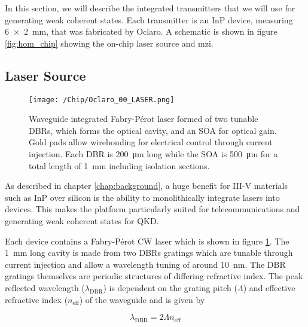 In this section, we will describe the integrated transmitters that we will use for generating weak coherent states. Each transmitter is an \ac{InP} device, measuring \SI{6x2}{mm}, that was fabricated by Oclaro. A schematic is shown in figure \ref{fig:hom_chip} showing the on-chip laser source and \ac{mzi}.

\subsection{Laser Source}

\begin{figure}[t]
	\centering
	\texttt{[image: /Chip/Oclaro\_00\_LASER.png]}
	\caption[Microscope image of the waveguide integrated Fabry-P\'{e}rot laser]{Waveguide integrated Fabry-P\'{e}rot laser formed of two tunable \acp{DBR}, which forms the optical cavity, and an \ac{SOA} for optical gain. Gold pads allow wirebonding for electrical control through current injection. Each \ac{DBR} is \SI{200}{\um} long while the \ac{SOA} is \SI{500}{\um} for a total length of \SI{1}{\mm} including isolation sections.}
	\label{fig:InP_laser}
\end{figure}

As described in chapter \ref{chap:background}, a huge benefit for III-V materials such as \ac{InP} over silicon is the ability to monolithically integrate lasers into devices. This makes the platform particularly suited for telecommunications and generating weak coherent states for \ac{QKD}. 


Each device contains a Fabry-P\'{e}rot \ac{CW} laser which is shown in figure \ref{fig:InP_laser}. The \SI{1}{mm} long cavity is made from two \acp{DBR} gratings which are tunable through current injection and allow a wavelength tuning of around \SI{10}{nm}. The \ac{DBR} gratings themselves are periodic structures of differing refractive index. The peak reflected wavelength ($\lambda_\text{DBR}$) is dependent on the grating pitch ($\Lambda$) and effective refractive index ($n_\text{eff}$) of the waveguide and is given by

\begin{equation}
	\lambda_\text{DBR} = 2\Lambda n_\text{eff}
\end{equation}

